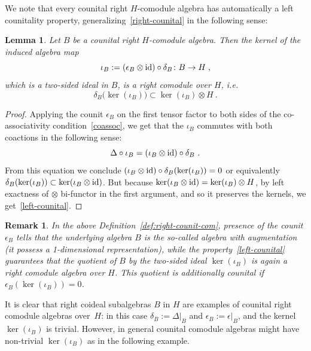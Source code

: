 \documentclass[11pt]{amsart}
\numberwithin{equation}{section}
\newtheorem{lem}[thm]{Lemma}
\newtheorem{rem}[thm]{Remark}
\numberwithin{equation}{section}
\begin{document}
 We note that every counital right $H$-comodule algebra has automatically a left counitality property, generalizing~\eqref{right-counital} in the following sense:

\begin{lem}\label{lem:Bcoid}
    Let $B$ be a counital right $H$-comodule algebra. 
Then the kernel of the induced algebra map 
	\begin{equation} \label{iota-B}
	\iota_B := (\epsilon_B \otimes \mathrm{id} ) \circ \delta_B \colon B \to H \; ,
	\end{equation}
	which is a two-sided ideal in $B$, is  a right comodule over $H$, i.e.\ 
	\begin{equation} \label{left-counital}
	\delta_B\bigl(\ker(\iota_B)\bigr) \subset \ker(\iota_B) \otimes H\ .
	\end{equation}
\end{lem}
\begin{proof}
Applying the counit $\epsilon_B$ on the first tensor factor to both sides of the co-associativity condition~\eqref{coassoc}, we
get that the $\iota_B$  commutes with both coactions in the following sense:
	\begin{equation}\label{eq:Delta-delta}
	 \Delta \circ \iota_B  =
	(\iota_B\otimes \mathrm{id})\circ\delta_B \ .
	\end{equation}
	From this equation we  conclude $(\iota_B\otimes \mathrm{id})\circ\delta_B (\ker(\iota_B)) = 0$ or equivalently $\delta_B (\ker(\iota_B)) \subset \ker(\iota_B\otimes \mathrm{id})$. But because $ \ker(\iota_B\otimes \mathrm{id}) = \ker(\iota_B) \otimes H$, by left exactness of $\otimes$ bi-functor in the first argument, and so it preserves the kernels, we get~\eqref{left-counital}.
\end{proof}

\begin{rem}
In the above Definition~\ref{def:right-counit-com}, presence of the  counit $\epsilon_B$ tells that the underlying algebra $B$ is the so-called algebra with augmentation (it possess a 1-dimensional representation), while the  property~\eqref{left-counital} guarantees that the quotient of $B$ by the two-sided ideal $\ker(\iota_B)$ is again a right comodule algebra over $H$. 
 This quotient is additionally counital if $\epsilon_B(\ker(\iota_B))=0$.
\end{rem}

It is clear that right coideal subalgebras $B$ in $H$ are examples of counital right comodule algebras over~$H$: in this case $\delta_B := \Delta|_{B}$ and $\epsilon_B := \epsilon|_{B}$, and the kernel $\ker(\iota_B)$ is trivial. However, in general  counital comodule algebras might have non-trivial $\ker(\iota_B)$ as in the following example.
\end{document}
